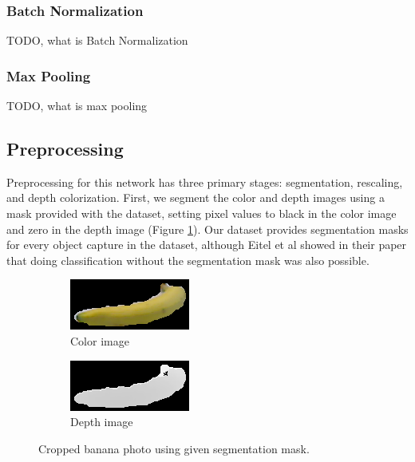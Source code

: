\subsubsection{Batch Normalization}
TODO, what is Batch Normalization

\subsubsection{Max Pooling}
TODO, what is max pooling




\subsection{Preprocessing}

Preprocessing for this network has three primary stages: segmentation, rescaling, and depth colorization. First, we segment the color and depth images using a mask provided with the dataset, setting pixel values to black in the color image and zero in the depth image (Figure \ref{fig:img_cropped}). Our dataset provides segmentation masks for every object capture in the dataset, although Eitel et al \cite{Eitel2015} showed in their paper that doing classification without the segmentation mask was also possible.

\begin{figure}[htbp]
	\centering
	\begin{subfigure}[b]{0.45\linewidth}
		\includegraphics[width=\textwidth]{img/banana_1_1_1_crop.png}
		\caption{Color image}
	\end{subfigure}   	
	\begin{subfigure}[b]{0.45\linewidth}
		\includegraphics[width=\textwidth]{img/banana_1_1_1_depth_crop.png}
		\caption{Depth image}
	\end{subfigure}
	\caption{Cropped banana photo using given segmentation mask.}
	\label{fig:img_cropped}
\end{figure}


